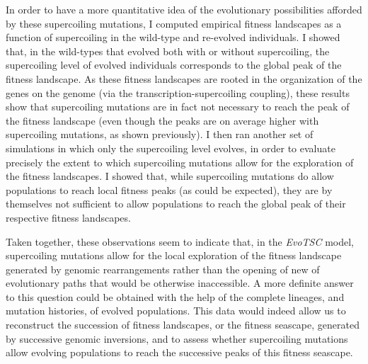 In order to have a more quantitative idea of the evolutionary possibilities afforded by these supercoiling mutations, I computed empirical fitness landscapes as a function of supercoiling in the wild-type and re-evolved individuals.
I showed that, in the wild-types that evolved both with or without supercoiling, the supercoiling level of evolved individuals corresponds to the global peak of the fitness landscape.
As these fitness landscapes are rooted in the organization of the genes on the genome (via the transcription-supercoiling coupling), these results show that supercoiling mutations are in fact not necessary to reach the peak of the fitness landscape (even though the peaks are on average higher with supercoiling mutations, as shown previously).
I then ran another set of simulations in which only the supercoiling level evolves, in order to evaluate precisely the extent to which supercoiling mutations allow for the exploration of the fitness landscapes.
I showed that, while supercoiling mutations do allow populations to reach local fitness peaks (as could be expected), they are by themselves not sufficient to allow populations to reach the global peak of their respective fitness landscapes.

Taken together, these observations seem to indicate that, in the \emph{EvoTSC} model, supercoiling mutations allow for the local exploration of the fitness landscape generated by genomic rearrangements rather than the opening of new of evolutionary paths that would be otherwise inaccessible.
A more definite answer to this question could be obtained with the help of the complete lineages, and mutation histories, of evolved populations.
This data would indeed allow us to reconstruct the succession of fitness landscapes, or the fitness seascape, generated by successive genomic inversions, and to assess whether supercoiling mutations allow evolving populations to reach the successive peaks of this fitness seascape.
